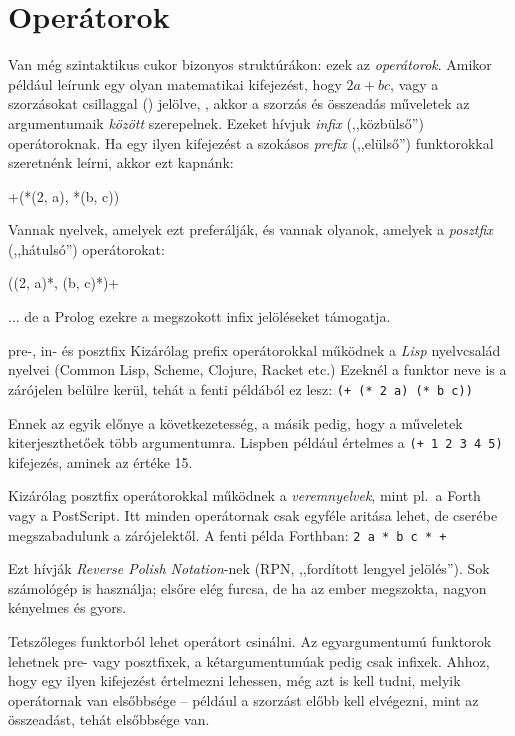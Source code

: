 \chapter{Operátorok}
Van még szintaktikus cukor bizonyos struktúrákon:
ezek az \emph{operátorok}. Amikor például leírunk
egy olyan matematikai kifejezést, hogy $2a+bc$, vagy
a szorzásokat csillaggal (\pr{*}) jelölve,
, akkor a szorzás és összeadás műveletek
az argumentumaik \emph{között} szerepelnek. Ezeket
hívjuk \emph{infix} (,,közbülső'') operátoroknak. Ha
egy ilyen kifejezést a szokásos \emph{prefix}
(,,elülső'') funktorokkal szeretnénk leírni, akkor
ezt kapnánk:
\begin{query}
+(*(2, a), *(b, c))
\end{query}
Vannak nyelvek, amelyek ezt preferálják, és vannak
olyanok, amelyek a \emph{posztfix} (,,hátulsó'')
operátorokat:
\begin{query}
((2, a)*, (b, c)*)+
\end{query}
... de a Prolog ezekre a megszokott infix
jelöléseket támogatja.

\begin{infobox}{}{pre-, in- és posztfix}
Kizárólag prefix operátorokkal működnek a
\emph{Lisp} nyelvcsalád nyelvei (Common Lisp,
Scheme, Clojure, Racket etc.) Ezeknél a funktor neve
is a zárójelen belülre kerül, tehát a fenti példából
ez lesz: {\tt (+ (* 2 a) (* b c))}

Ennek az egyik előnye a következetesség, a másik
pedig, hogy a műveletek kiterjeszthetőek több
argumentumra. Lispben például értelmes a {\tt (+ 1 2
  3 4 5)} kifejezés, aminek az értéke 15.

Kizárólag posztfix operátorokkal működnek a
\emph{veremnyelvek}, mint pl.~a Forth vagy a
PostScript. Itt minden operátornak csak egyféle
aritása lehet, de cserébe megszabadulunk a
zárójelektől. A fenti példa Forthban: {\tt 2 a * b c
  * +} 

Ezt hívják \emph{Reverse Polish Notation}-nek (RPN,
,,fordított lengyel jelölés''). Sok számológép is
használja; elsőre elég furcsa, de ha az ember
megszokta, nagyon kényelmes és gyors.
\end{infobox}

Tetszőleges funktorból lehet operátort csinálni. Az
egyargumentumú funktorok lehetnek pre- vagy
posztfixek, a kétargumentumúak pedig csak
infixek. Ahhoz, hogy egy ilyen kifejezést értelmezni
lehessen, még azt is kell tudni, melyik operátornak
van elsőbbsége -- például a szorzást előbb kell
elvégezni, mint az összeadást, tehát elsőbbsége van.

